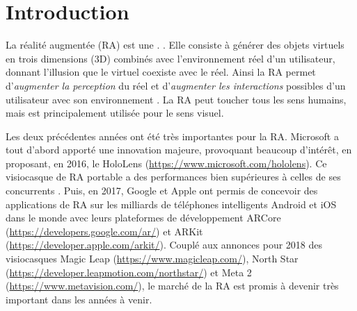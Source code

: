 \chapter*{Introduction}
\label{ch:introduction}

La réalité augmentée (RA) est une . \citep{OQLFRA2017}. Elle consiste à générer des objets virtuels en trois dimensions (3D) combinés avec l'environnement réel d'un utilisateur, donnant l'illusion que le virtuel coexiste avec le réel. Ainsi la RA permet d'\emph{augmenter la perception} du réel et d'\emph{augmenter les interactions} possibles d'un utilisateur avec son environnement \citep{Azuma1997}. La RA peut toucher tous les sens humains, mais est principalement utilisée pour le sens visuel.


Les deux précédentes années ont été très importantes pour la RA. Microsoft a tout d'abord apporté une innovation majeure, provoquant beaucoup d'intérêt, en proposant, en 2016, le HoloLens (\url{https://www.microsoft.com/hololens}). Ce visiocasque de RA portable a des performances bien supérieures à celles de ses concurrents . Puis, en 2017, Google et Apple ont permis de concevoir des applications de RA sur les milliards de téléphones intelligents Android et iOS dans le monde avec leurs plateformes de développement ARCore (\url{https://developers.google.com/ar/}) et ARKit (\url{https://developer.apple.com/arkit/}). Couplé aux annonces pour 2018 des visiocasques Magic Leap (\url{https://www.magicleap.com/}), North Star (\url{https://developer.leapmotion.com/northstar/}) et Meta 2 (\url{https://www.metavision.com/}), le marché de la RA est promis à devenir très important dans les années à venir.


